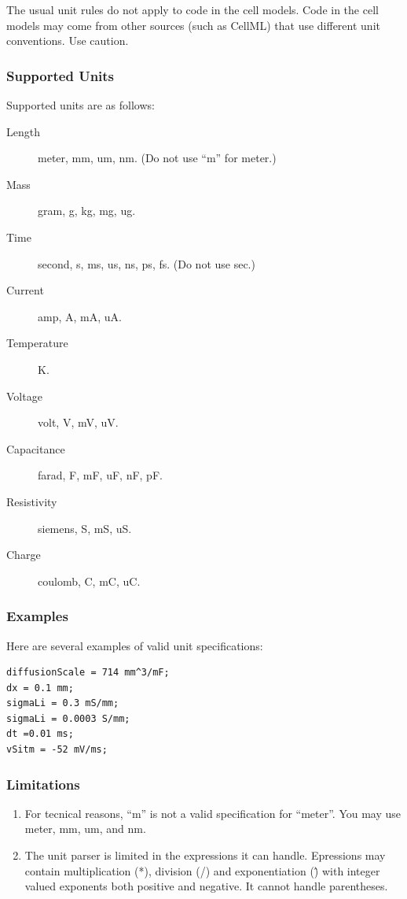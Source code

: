 \documentclass{article}
\begin{document}
The usual unit rules do not apply to code in the cell models.  Code in
the cell models may come from other sources (such as CellML) that use
different unit conventions.  Use caution.

\subsubsection{Supported Units}

Supported units are as follows:
\begin{description}
\item[Length] meter, mm, um, nm.  (Do not use ``m'' for meter.)
\item[Mass] gram, g, kg, mg, ug.
\item[Time] second, s, ms, us, ns, ps, fs.  (Do not use sec.)
\item[Current] amp, A, mA, uA.
\item[Temperature] K.
\item[Voltage] volt, V, mV, uV.
\item[Capacitance] farad, F, mF, uF, nF, pF.
\item[Resistivity] siemens, S, mS, uS.
\item[Charge] coulomb, C, mC, uC.
\end{description}


\subsubsection{Examples}

Here are several examples of valid unit specifications:

\begin{verbatim}
diffusionScale = 714 mm^3/mF;
dx = 0.1 mm;
sigmaLi = 0.3 mS/mm;
sigmaLi = 0.0003 S/mm;
dt =0.01 ms;
vSitm = -52 mV/ms;
\end{verbatim}

\subsubsection{Limitations}

\begin{enumerate}
\item For tecnical reasons, ``m'' is not a valid specification for
  ``meter''.  You may use meter, mm, um, and nm.
  \item The unit parser is limited in the expressions it can handle.
    Epressions may contain multiplication (*), division (/) and
    exponentiation (\^) with integer valued exponents both positive and
    negative.  It cannot handle parentheses.  
\end{enumerate}
\end{document}
